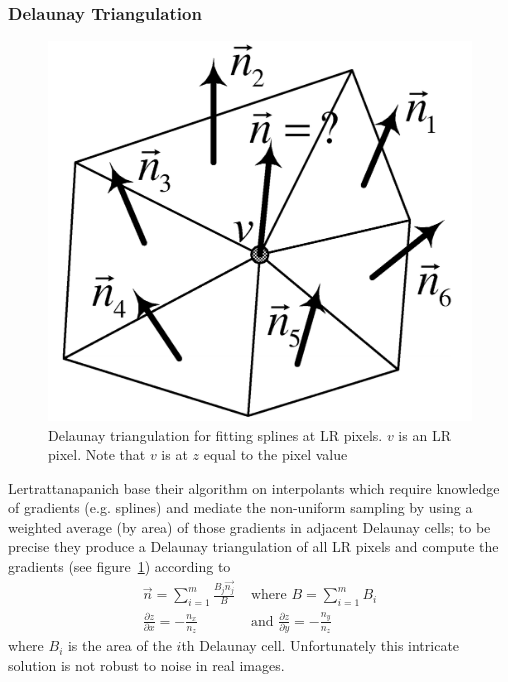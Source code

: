 \subsubsection{Delaunay Triangulation}

\begin{figure}
    \centering
    \includegraphics[width=.7\linewidth]{figures/delauney.png}
    \caption{Delaunay triangulation for fitting splines at LR pixels\cite{Lertrattanapanich}. $v$ is an LR pixel. Note that $v$ is at $z$ equal to the pixel value}
    \label{fig:delauney}
\end{figure}
Lertrattanapanich \cite{Lertrattanapanich} base their algorithm on interpolants which require knowledge of gradients (e.g. splines) and mediate the non-uniform sampling by using a weighted average (by area) of those gradients in adjacent Delaunay cells; to be precise they produce a Delaunay triangulation of all LR pixels and compute the gradients (see figure~\ref{fig:delauney}) according to
\begin{align*}
    \vec{n} = \sum_{i=1}^m \frac{B_j \vec{n_j}}{B} &\text{ where } B=\sum_{i=1}^m B_i\\
    \frac{\partial z}{\partial x} = -\frac{n_x}{n_z} &\text{ and }  \frac{\partial z}{\partial y} = -\frac{n_y}{n_z}
\end{align*}
where $B_i$ is the area of the $i$th Delaunay cell.
%
Unfortunately this intricate solution is not robust to noise in real images.
